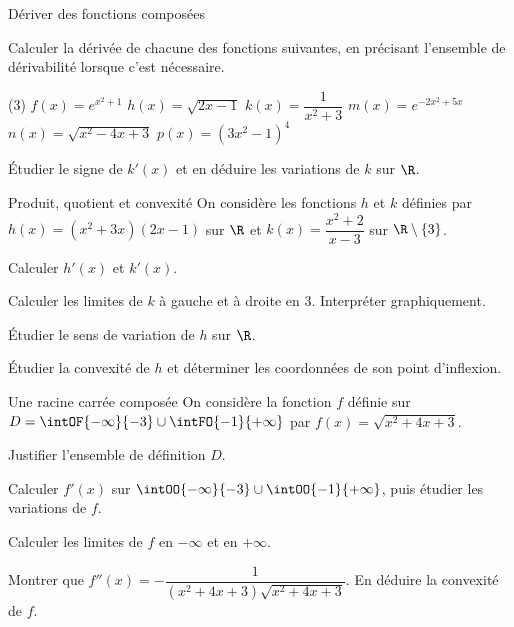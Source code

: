 \begin{exercice}[2]{Dériver des fonctions composées}
\begin{questions}
  \item Calculer la dérivée de chacune des fonctions suivantes, en précisant l'ensemble de dérivabilité
    lorsque c'est nécessaire.
    \begin{tasks}(3)
      \task $f(x)=e^{x^{2}+1}$
      \task $h(x)=\sqrt{2x-1}$
      \task $k(x)=\dfrac{1}{x^{2}+3}$
      \task $m(x)=e^{-2x^{2}+5x}$
      \task $n(x)=\sqrt{x^{2}-4x+3}$
      \task $p(x)=\left(3x^{2}-1\right)^{4}$
    \end{tasks}
  \item Étudier le signe de $k'(x)$ et en déduire les variations de $k$ sur $\R$.
\end{questions}
\end{exercice}

\begin{exercice}[2]{Produit, quotient et convexité}
On considère les fonctions $h$ et $k$ définies par $h(x)=\left(x^{2}+3x\right)(2x-1)$ sur $\R$ et
$k(x)=\dfrac{x^{2}+2}{x-3}$ sur $\R\setminus\{3\}$.
\begin{questions}
  \item Calculer $h'(x)$ et $k'(x)$.
  \item Calculer les limites de $k$ à gauche et à droite en $3$. Interpréter graphiquement.
  \item Étudier le sens de variation de $h$ sur $\R$.
  \item Étudier la convexité de $h$ et déterminer les coordonnées de son point d'inflexion.
\end{questions}
\end{exercice}

\begin{exercice}[2]{Une racine carrée composée}
On considère la fonction $f$ définie sur $D=\intOF{-\infty}{-3}\cup\intFO{-1}{+\infty}$ par $f(x)=\sqrt{x^{2}+4x+3}$.
\begin{questions}
  \item Justifier l'ensemble de définition $D$.
  \item Calculer $f'(x)$ sur $\intOO{-\infty}{-3}\cup\intOO{-1}{+\infty}$, puis étudier les variations de $f$.
  \item Calculer les limites de $f$ en $-\infty$ et en $+\infty$.
  \item Montrer que $f''(x)=-\dfrac{1}{\left(x^{2}+4x+3\right)\sqrt{x^{2}+4x+3}}$. En déduire la convexité de $f$.
\end{questions}
\end{exercice}

